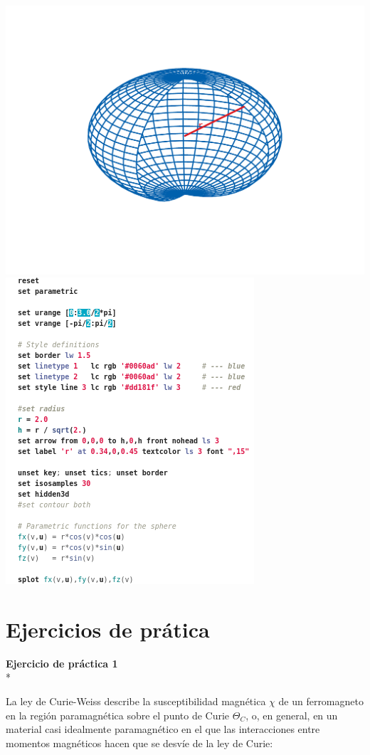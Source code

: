 \documentclass[11.5pt,a4paper]{article}
\begin{document}
\includegraphics[scale=0.35]{ejemplo14.pdf}
\includegraphics[scale=0.45]{screen21.png}



\newpage
\section{Ejercicios de prática}

\textbf{Ejercicio de práctica 1}\\*

La ley de Curie-Weiss describe la susceptibilidad magnética $\chi$ de un ferromagneto en la región paramagnética sobre el punto de Curie $\Theta_{C}$, o, en general, en un material casi idealmente paramagnético en el que las interacciones entre momentos magnéticos hacen que se desvíe de la ley de Curie: 
\end{document}
